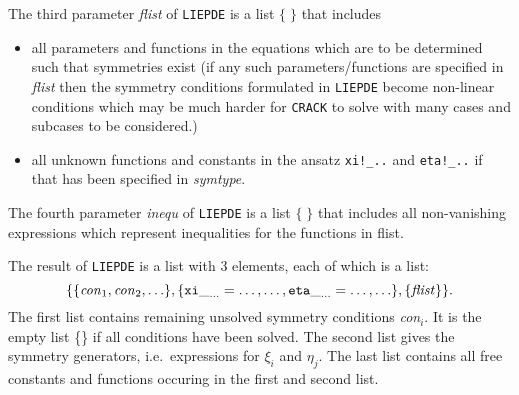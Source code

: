 \documentclass[12pt]{article}
\begin{document}
\noindent The third parameter {\it flist} of {\tt LIEPDE} is a list $\{\;\}$ 
that includes
\begin{itemize}
\item all parameters and functions in the equations which are to
      be determined such that symmetries exist (if any such 
      parameters/functions are 
      specified in {\it flist} then the symmetry conditions 
      formulated in {\tt LIEPDE}
      become non-linear conditions which may be much harder for
      {\tt CRACK} to solve with many cases and subcases to be considered.)
\item all unknown functions and constants in the ansatz 
      \verb+xi!_..+ and \verb+eta!_..+
      if that has been specified in {\it symtype}.
\end{itemize}
\noindent The fourth parameter {\it inequ} of {\tt LIEPDE} is a list $\{\;\}$ 
that includes all non-vanishing expressions which represent
inequalities for the functions in flist.

The result of {\tt LIEPDE} is a list with 3 elements, each of which
is a list:
\[ \{\{{\it con}_1,{\it con}_2,\ldots\},
     \{{\tt xi}\__{\ldots}=\ldots, \ldots,
       {\tt eta}\__{\ldots}=\ldots, \ldots\},
     \{{\it flist}\}\}. \]
The first list contains remaining unsolved symmetry conditions {\it con}$_i$. It
is the empty list \{\} if all conditions have been solved. The second list
gives the symmetry generators, i.e.\ expressions for $\xi_i$ and $\eta_j$. The 
last list contains all free constants and functions occuring in the first
and second list.

%
%
\end{document}
